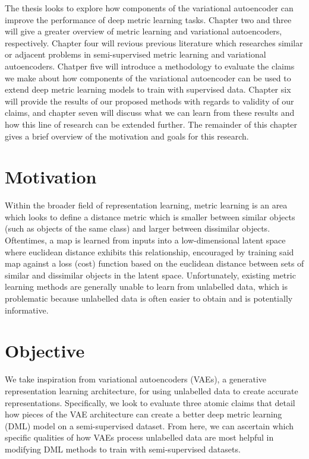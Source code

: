 \documentclass[./dissertation.tex]{subfiles}
\begin{document}
    The thesis looks to explore how components of the variational autoencoder can improve the performance of deep metric learning tasks. Chapter two and three will give a greater overview of metric learning and variational autoencoders, respectively. Chapter four will revious previous literature which researches similar or adjacent problems in semi-supervised metric learning and variational autoencoders. Chatper five will introduce a methodology to evaluate the claims we make about how components of the variational autoencoder can be used to extend deep metric learning models to train with supervised data. Chapter six will provide the results of our proposed methods with regards to validity of our claims, and chapter seven will discuss what we can learn from these results and how this line of research can be extended further. The remainder of this chapter gives a brief overview of the motivation and goals for this research. 

    \section{Motivation}
    Within the broader field of representation learning, metric learning is an area which looks to define a distance metric which is smaller between similar objects (such as objects of the same class) and larger between dissimilar objects. Oftentimes, a map is learned from inputs into a low-dimensional latent space where euclidean distance exhibits this relationship, encouraged by training said map against a loss (cost) function based on the euclidean distance between sets of similar and dissimilar objects in the latent space. Unfortunately, existing metric learning methods are generally unable to learn from unlabelled data, which is problematic because unlabelled data is often easier to obtain and is potentially informative.

    \section{Objective}
    We take inspiration from variational autoencoders (VAEs), a generative representation learning architecture, for using unlabelled data to create accurate representations. Specifically, we look to evaluate three atomic claims that detail how pieces of the VAE architecture can create a better deep metric learning (DML) model on a semi-supervised dataset. From here, we can ascertain which specific qualities of how VAEs process unlabelled data are most helpful in modifying DML methods to train with semi-supervised datasets. \\
    
\end{document}
